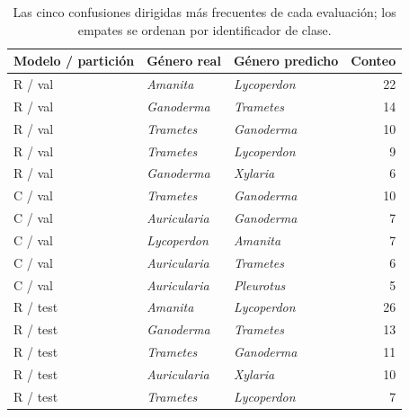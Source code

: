 \begin{table}[H]
\centering
\footnotesize
\caption{Las cinco confusiones dirigidas más frecuentes de cada evaluación; los empates se ordenan por identificador de clase.}
\label{tab:confusions}
\begin{tabularx}{\linewidth}{l Y Y r}
\toprule
\textbf{Modelo / partición} & \textbf{Género real} & \textbf{Género predicho} & \textbf{Conteo}\\
\midrule
R / val & \textit{Amanita} & \textit{Lycoperdon} & 22\\
R / val & \textit{Ganoderma} & \textit{Trametes} & 14\\
R / val & \textit{Trametes} & \textit{Ganoderma} & 10\\
R / val & \textit{Trametes} & \textit{Lycoperdon} & 9\\
R / val & \textit{Ganoderma} & \textit{Xylaria} & 6\\
C / val & \textit{Trametes} & \textit{Ganoderma} & 10\\
C / val & \textit{Auricularia} & \textit{Ganoderma} & 7\\
C / val & \textit{Lycoperdon} & \textit{Amanita} & 7\\
C / val & \textit{Auricularia} & \textit{Trametes} & 6\\
C / val & \textit{Auricularia} & \textit{Pleurotus} & 5\\
R / test & \textit{Amanita} & \textit{Lycoperdon} & 26\\
R / test & \textit{Ganoderma} & \textit{Trametes} & 13\\
R / test & \textit{Trametes} & \textit{Ganoderma} & 11\\
R / test & \textit{Auricularia} & \textit{Xylaria} & 10\\
R / test & \textit{Trametes} & \textit{Lycoperdon} & 7\\
\bottomrule
\end{tabularx}
\end{table}
